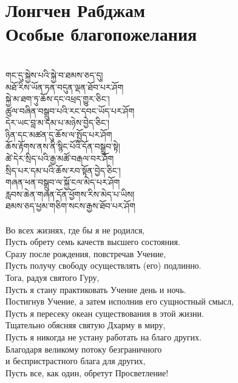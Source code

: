 \section{Лонгчен Рабджам \\ Особые благопожелания}
\\
\ti
གང་དུ་སྐྱེས་པའི་སྐྱེ་བ་ཐམས་ཅད་དུ།\\
མཐོ་རིས་ཡོན་ཏན་བདུན་ལྡན་ཐོབ་པར་ཤོག\\
སྐྱེ་མ་ཐག་ཏུ་ཆོས་དང་འཕྲད་གྱུར་ཅིང༌།\\
ཚུལ་བཞིན་བསྒྲུབ་པའི་རང་དབང་ཡོད་པར་ཤོག\\
དེར་ཡང་བླ་མ་དམ་པ་མཉེས་བྱེད་ཅིང༌། \\
ཉིན་དང་མཚན་དུ་ཆོས་ལ་སྤྱོད་པར་ཤོག\\
ཆོས་རྟོགས་ནས་ནི་སྙིང་པོའི་དོན་བསྒྲུབ་སྟེ།\\
ཚེ་དེར་སྲིད་པའི་རྒྱ་མཚོ་བརྒལ་བར་ཤོག \\
སྲིད་པར་དམ་པའི་ཆོས་རབ་སྟོན་བྱེད་ཅིང༌།\\
གཞན་ཕན་བསྒྲུབ་ལ་སྐྱོ་ངལ་མེད་པར་ཤོག\\
རླབས་ཆེན་གཞན་དོན་ཕྱོགས་རིས་མེད་པ་ཡིས།\\
ཐམས་ཅད་ཕྱམ་གཅིག་སངས་རྒྱས་ཐོབ་པར་ཤོག\\
\\
\ru Во всех жизнях, где бы я не родился,\\
Пусть обрету семь качеств высшего состояния.\\
Сразу после рождения, повстречав Учение,\\
Пусть получу свободу осуществлять (его) подлинно.\\
Тога, радуя святого Гуру,\\
Пусть я стану практиковать Учение день и ночь.\\
Постигнув Учение, а затем исполнив его сущностный смысл,\\
Пусть я пересеку океан существования в этой жизни.\\
Тщательно обясняя святую Дхарму в миру,\\
Пусть я никогда не устану работать на благо других.\\
Благодаря великому потоку безграничного\\
и беспристрастного блага для других,\\
Пусть все, как один, обретут Просветление!\\
\\
\newpage
